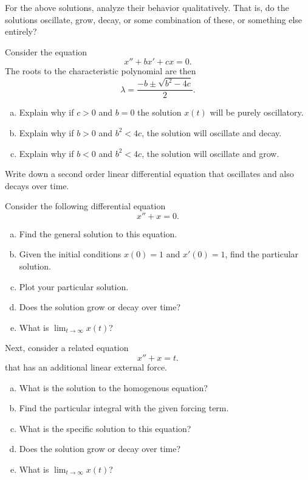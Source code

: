 \begin{problem}
For the above solutions, analyze their behavior qualitatively. That is, do the solutions oscillate, grow, decay, or some combination of these, or something else entirely?
\end{problem}

\begin{problem}
Consider the equation
\[
x''+bx'+cx=0.
\]
The roots to the characteristic polynomial are then
\[
\lambda = \frac{-b\pm \sqrt{b^2-4c}}{2}.
\]
\begin{enumerate}[(a)]
    \item Explain why if $c>0$ and $b=0$ the solution $x(t)$ will be purely oscillatory.
    \item Explain why if $b>0$ and $b^2<4c$, the solution will oscillate and decay.
    \item Explain why if $b<0$ and $b^2<4c$, the solution will oscillate and grow.
\end{enumerate}
\end{problem}

\begin{problem}
Write down a second order linear differential equation that oscillates and also decays over time.
\end{problem}

\begin{problem}
Consider the following differential equation
\[
x''+x=0.
\]
\begin{enumerate}[(a)]
    \item Find the general solution to this equation.
    \item Given the initial conditions $x(0)=1$ and $x'(0)=1$, find the particular solution.
    \item Plot your particular solution.
    \item Does the solution grow or decay over time?
    \item What is $\lim_{t\to \infty}x(t)$?
\end{enumerate}

\end{problem}

\begin{problem}
Next, consider a related equation
\[
x''+x=t.
\]
that has an additional linear external force.
\begin{enumerate}[(a)]
    \item What is the solution to the homogenous equation?
    \item Find the particular integral with the given forcing term.
    \item What is the specific solution to this equation?
    \item Does the solution grow or decay over time?
    \item What is $\lim_{t\to \infty}x(t)$?
\end{enumerate}
\end{problem}

